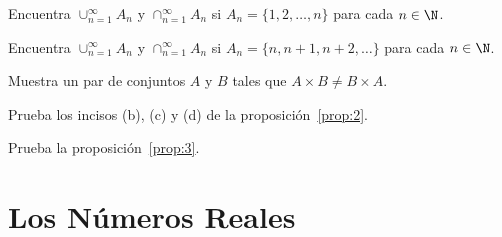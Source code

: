\documentclass[12pt,a4paper]{book}
\begin{document}
    \begin{ejercicio}\label{ej:5}
        Encuentra $\cup_{n=1}^{\infty}A_{n}$ y $\cap_{n=1}^{\infty}A_{n}$ si $A_{n}=\{1,2,\ldots,n\}$ para cada
        $n\in\N$.
    \end{ejercicio}

    \begin{ejercicio}\label{ej:6}
        Encuentra $\cup_{n=1}^{\infty}A_{n}$ y $\cap_{n=1}^{\infty}A_{n}$ si $A_{n}=\{n,n+1,n+2,\ldots\}$ para
        cada $n\in\N$.
    \end{ejercicio}

    \begin{ejercicio}\label{ej:7}
        Muestra un par de conjuntos $A$ y $B$ tales que $A\times B\neq B\times A$.
    \end{ejercicio}

    \begin{ejercicio}\label{ej:8}
        Prueba los incisos (b), (c) y (d) de la proposición~\ref{prop:2}.
    \end{ejercicio}

    \begin{ejercicio}\label{ej:9}
        Prueba la proposición~\ref{prop:3}.
    \end{ejercicio}

    \chapter{Los Números Reales}\label{cap:reales}
\end{document}
